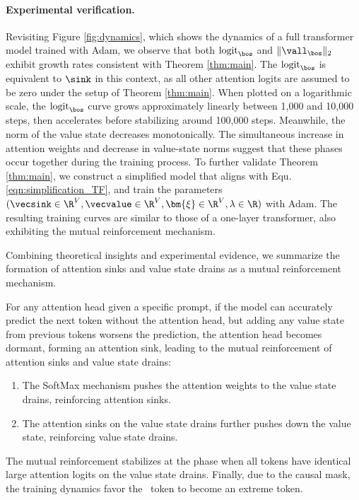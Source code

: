 \paragraph{Experimental verification.} Revisiting Figure \ref{fig:dynamics}, which shows the dynamics of a full transformer model trained with Adam, we observe that both $\text{logit}_{\bos}$ and $\|\vall_{\bos}\|_2$ exhibit growth rates consistent with Theorem \ref{thm:main}. The $\text{logit}_{\bos}$ is equivalent to $\sink$ in this context, as all other attention logits are assumed to be zero under the setup of Theorem \ref{thm:main}. When plotted on a logarithmic scale, the $\text{logit}_{\bos}$ curve grows approximately linearly between 1,000 and 10,000 steps, then accelerates before stabilizing around 100,000 steps.  Meanwhile, the norm of the value state decreases monotonically. The simultaneous increase in attention weights and decrease in value-state norms suggest that these phases occur together during the training process. To further validate Theorem \ref{thm:main}, we construct a simplified model that aligns with Equ. \eqref{eqn:simplification_TF}, and train the parameters $(\vecsink \in \R^{V}, \vecvalue \in \R^V, \bm{\xi} \in \R^V, \lambda \in \R)$ with Adam. The resulting training curves are similar to those of a one-layer transformer, also exhibiting the mutual reinforcement mechanism.

Combining theoretical insights and experimental evidence, we summarize the formation of attention sinks and value state drains as a mutual reinforcement mechanism.


\begin{claim}
For any attention head given a specific prompt, if the model can accurately predict the next token without the attention head, but adding any value state from previous tokens worsens the prediction, the attention head becomes dormant, forming an attention sink, leading to the mutual reinforcement of attention sinks and value state drains: 
\begin{enumerate}[leftmargin=2em]
\setlength\itemsep{0pt}
    \item The SoftMax mechanism pushes the attention weights to the value state drains, reinforcing attention sinks.
    \item The attention sinks on the value state drains further pushes down the value state, reinforcing value state drains.
\end{enumerate} 
The mutual reinforcement stabilizes at the phase when all tokens have identical large attention logits on the value state drains. 
Finally, due to the causal mask, the training dynamics favor the \bos~token to become an extreme token.
\end{claim}

